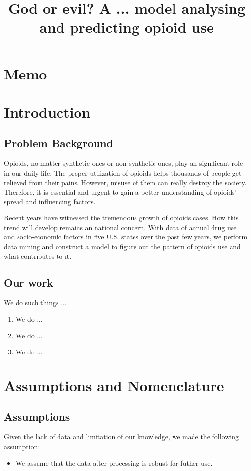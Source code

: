 \documentclass[11pt]{article}
\title{\large God or evil? A ... model analysing and predicting opioid use}  %
\newcommand{\upcite}[1]{\textsuperscript{\textsuperscript{\cite{#1}}}}
\begin{document}

\section*{Memo}
\newpage

\section{Introduction}
\subsection{Problem Background}
Opioids, no matter synthetic ones or non-synthetic ones, play an significant role in our daily life. The proper utilization of opioids helps thousands of people get relieved from their pains. However, misuse of them can really destroy the society. Therefore, it is essential and urgent to gain a better understanding of opioids' spread and influencing factors.

Recent years have witnessed the tremendous growth of opioids cases. How this trend will develop remains an national concern. With data of annual drug use and socio-economic factors in five U.S. states over the past few years, we perform data mining and construct a model to figure out the pattern of opioids use and what contributes to it.


\subsection{Our work}
We do such things ...

\begin{enumerate}[\bfseries 1.]
    \item We do ...
    \item We do ...
    \item We do ...
\end{enumerate}

\section{Assumptions and Nomenclature}
\subsection{Assumptions}
Given the lack of data and limitation of our knowledge, we made the following assumption:
\begin{itemize}
    \item We assume that the data after processing is robust for futher use.
\end{itemize}
\end{document}
